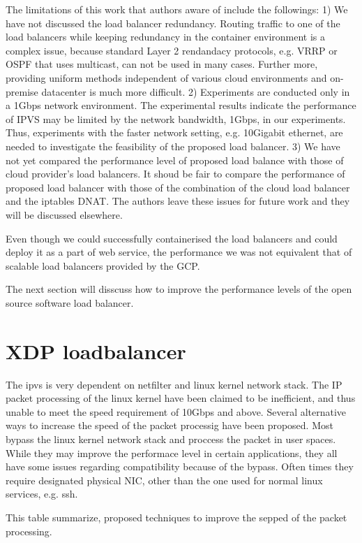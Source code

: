 The limitations of this work that authors aware of include the followings: 
1) We have not discussed the load balancer redundancy. 
Routing traffic to one of the load balancers while keeping redundancy in the container environment is a complex issue,
because standard Layer 2 rendandacy protocols, e.g. VRRP or OSPF\cite{moy1997ospf} that uses multicast, can not be used in many cases.
Further more, providing uniform methods independent of various cloud environments and on-premise datacenter is much more difficult.   
2) Experiments are conducted only in a 1Gbps network environment.
The experimental results indicate the performance of IPVS may be limited by the network bandwidth, 1Gbps, in our experiments. 
Thus, experiments with the faster network setting, e.g. 10Gigabit ethernet, are needed to investigate the feasibility of the proposed load balancer.
3) We have not yet compared the performance level of proposed load balance with those of cloud provider's load balancers.
It shoud be fair to compare the performance of proposed load balancer with those of the combination of the cloud load balancer and the iptables DNAT. 
The authors leave these issues for future work and they will be discussed elsewhere.


Even though we could successfully containerised the load balancers and could deploy it as a part of web service, the performance we was not equivalent that of scalable load balancers provided by the GCP.

The next section will disscuss how to improve the performance levels of the open source software load balancer. 

\section{XDP loadbalancer}\label{XDP loadbalancer}
The ipvs is very dependent on netfilter and linux kernel network stack.
The IP packet processing of the linux kernel have been claimed to be inefficient, and thus unable to meet the speed requirement of 10Gbps and above.
Several alternative ways to increase the speed of the packet processig have been proposed.
Most bypass the linux kernel network stack and proccess the packet in user spaces.
While they may improve the performace level in certain applications, they all have some issues regarding compatibility because of the bypass.
Often times they require designated physical NIC, other than the one used for normal linux services, e.g. ssh.

This table summarize, proposed techniques to improve the sepped of the packet processing.

